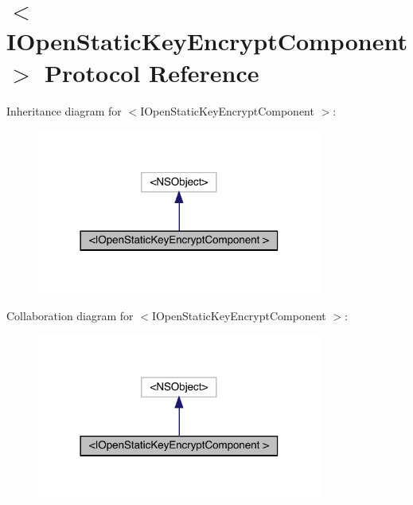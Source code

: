 \hypertarget{protocol_i_open_static_key_encrypt_component_01-p}{}\section{$<$I\+Open\+Static\+Key\+Encrypt\+Component $>$ Protocol Reference}
\label{protocol_i_open_static_key_encrypt_component_01-p}


Inheritance diagram for $<$I\+Open\+Static\+Key\+Encrypt\+Component $>$\+:\nopagebreak
\begin{figure}[H]
\begin{center}
\leavevmode
\includegraphics[width=266pt]{protocol_i_open_static_key_encrypt_component_01-p__inherit__graph}
\end{center}
\end{figure}


Collaboration diagram for $<$I\+Open\+Static\+Key\+Encrypt\+Component $>$\+:\nopagebreak
\begin{figure}[H]
\begin{center}
\leavevmode
\includegraphics[width=266pt]{protocol_i_open_static_key_encrypt_component_01-p__coll__graph}
\end{center}
\end{figure}
